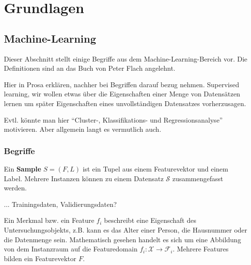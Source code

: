 
\newpage

\section{Grundlagen}
\textit{}

\subsection{Machine-Learning}
Dieser Abschnitt stellt einige Begriffe aus dem Machine-Learning-Bereich vor. 
Die Definitionen sind an das Buch von Peter Flach \cite{Flach:2012:MLA:2490546} angelehnt.

Hier in Prosa erklären, nachher bei Begriffen darauf bezug nehmen.
Supervised learning, wir wollen etwas über die Eigenschaften einer Menge von Datensätzen lernen um später 
Eigenschaften eines unvollständigen Datensatzes vorherzusagen.

Evtl. könnte man hier 
``Cluster-, Klassifikations- und Regressionsanalyse'' motivieren.
Aber allgemein langt es vermutlich auch.



\subsubsection{Begriffe}

\begin{term}[Instanz]
Ein \textbf{Sample} $S = (F, L)$ ist ein Tupel aus einem Featurevektor und einem Label. 
Mehrere Instanzen können zu einem Datensatz $\mathcal{S}$ zusammengefasst werden.
\end{term}

\begin{term}[Datensatz]
... Trainingsdaten, Validierungsdaten?
\end{term}

\begin{term}
Ein Merkmal bzw. ein Feature $f_i$ beschreibt eine Eigenschaft des Untersuchungsobjekts, z.B. kann es das Alter einer Person, die Hausnummer oder die Datenmenge sein. 
Mathematisch gesehen handelt es sich um eine Abbildung von dem Instanzraum auf die Featuredomain $f_i : \mathscr{X} \rightarrow \mathscr{F}_i$. 
Mehrere Features bilden ein Featurevektor $F$. 
\end{term}

